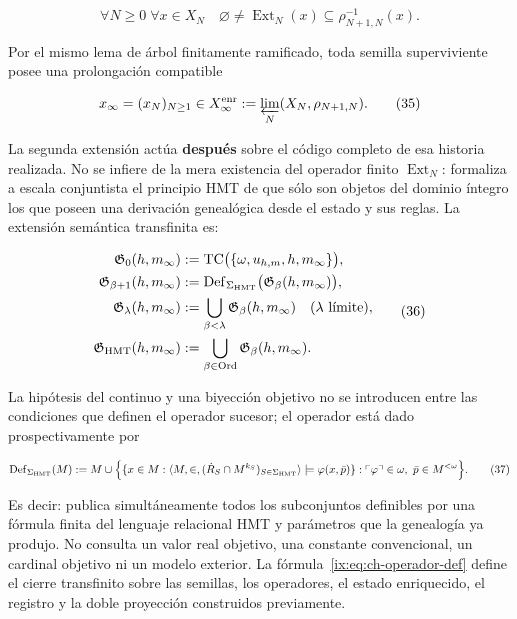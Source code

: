 \[
 \forall N\ge0\;\forall x\in X_N\quad
 \varnothing\ne\operatorname{Ext}_N(x)
 \subseteq\rho_{N+1,N}^{-1}(x).
\tag{34}\label{ix:eq:ch-extension-no-vacia}
\]

Por el mismo lema de árbol finitamente ramificado, toda semilla superviviente
posee una prolongación compatible

\[
 x_\infty=(x_N)_{N\ge1}\in
 X_\infty^{\rm enr}:=\varprojlim_N(X_N,\rho_{N+1,N}).
\tag{35}\label{ix:eq:ch-limite-inverso}
\]

La segunda extensión actúa \textbf{después} sobre el código completo de esa
historia realizada.
No se infiere de la mera existencia del operador finito
\(\operatorname{Ext}_N\): formaliza a escala conjuntista el principio HMT de
que sólo son objetos del dominio íntegro los que poseen una derivación
genealógica desde el estado y sus reglas. La extensión semántica transfinita
es:

\[
 \begin{aligned}
  \mathfrak G_0(h,m_\infty)
  &:=\operatorname{TC}\bigl(\{\omega,u_{h,m},h,m_\infty\}\bigr),\\
  \mathfrak G_{\beta+1}(h,m_\infty)
  &:=\operatorname{Def}_{\Sigma_{\rm HMT}}
       \bigl(\mathfrak G_\beta(h,m_\infty)\bigr),\\
  \mathfrak G_\lambda(h,m_\infty)
  &:=\bigcup_{\beta<\lambda}\mathfrak G_\beta(h,m_\infty)
       \quad(\lambda\text{ límite}),\\
  \mathfrak G_{\rm HMT}(h,m_\infty)
  &:=\bigcup_{\beta\in\operatorname{Ord}}
       \mathfrak G_\beta(h,m_\infty).
 \end{aligned}
\tag{36}\label{ix:eq:ch-clausura-transfinita}
\]

La hipótesis del continuo y una biyección objetivo no se introducen entre las
condiciones que definen el operador sucesor; el operador está dado
prospectivamente por

\[
 \operatorname{Def}_{\Sigma_{\rm HMT}}(M)
 :=M\cup
 \Bigl\{
   \{x\in M:\langle M,\in,
       (\dot R_S\cap M^{k_S})_{S\in\Sigma_{\rm HMT}}\rangle
       \models\varphi(x,\bar p)\}:
   \ulcorner\varphi\urcorner\in\omega,
   \ \bar p\in M^{<\omega}
 \Bigr\}.
\tag{37}\label{ix:eq:ch-operador-def}
\]

Es decir: publica simultáneamente todos los subconjuntos definibles por una
fórmula finita del lenguaje relacional HMT y parámetros que la genealogía ya
produjo. No
consulta un valor real objetivo, una constante convencional, un cardinal
objetivo ni un modelo exterior. La fórmula~\eqref{ix:eq:ch-operador-def} define el cierre transfinito
sobre las semillas, los operadores, el estado enriquecido, el registro y la
doble proyección construidos previamente.

